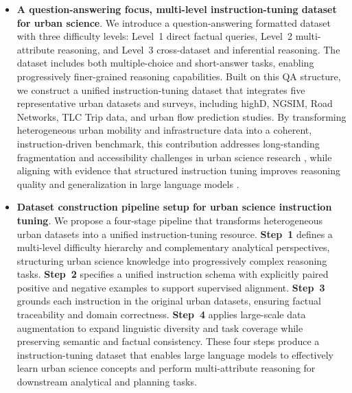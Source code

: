 \documentclass[a4paper,fleqn]{cas-sc}
\begin{document}
\begin{itemize}

    \item \textbf{A question-answering focus, multi-level instruction-tuning dataset for urban science}. 
   We introduce a question-answering formatted dataset with three difficulty levels: Level~1 direct factual queries, Level~2 multi-attribute reasoning, and Level~3 cross-dataset and inferential reasoning. The dataset includes both multiple-choice and short-answer tasks, enabling progressively finer-grained reasoning capabilities. Built on this QA structure, we construct a unified instruction-tuning dataset that integrates five representative urban datasets and surveys, including highD, NGSIM, Road Networks, TLC Trip data, and urban flow prediction studies. By transforming heterogeneous urban mobility and infrastructure data into a coherent, instruction-driven benchmark, this contribution addresses long-standing fragmentation and accessibility challenges in urban science research \cite{zheng2014urban, batty2013new}, while aligning with evidence that structured instruction tuning improves reasoning quality and generalization in large language models \cite{longpre2023flan, wang2022supernaturalinstructions}.

   \item \textbf{Dataset construction pipeline setup for urban science instruction tuning}. We propose a four-stage pipeline that transforms heterogeneous urban datasets into a unified instruction-tuning resource. \textbf{Step~1} defines a multi-level difficulty hierarchy and complementary analytical perspectives, structuring urban science knowledge into progressively complex reasoning tasks. \textbf{Step~2} specifies a unified instruction schema with explicitly paired positive and negative examples to support supervised alignment. \textbf{Step~3} grounds each instruction in the original urban datasets, ensuring factual traceability and domain correctness. \textbf{Step~4} applies large-scale data augmentation to expand linguistic diversity and task coverage while preserving semantic and factual consistency. These four steps produce a instruction-tuning dataset that enables large language models to effectively learn urban science concepts and perform multi-attribute reasoning for downstream analytical and planning tasks.
    

\end{itemize}
\end{document}
